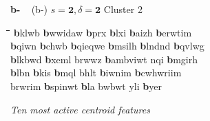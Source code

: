 \begin{figure}[ht]
\begin{mdframed}
{\LARGE \textbf{b-}}  {\large\,\,\, (b-)} \hfill {\large$s=\textbf{2}, \delta=\textbf{2}$} \hfill Cluster 2\\
\vspace{-10pt}
\begin{normalsize}
\begin{tabbing}
\hspace*{14ex}\= \hspace*{14ex}\=\hspace*{14ex}\=\hspace*{14ex}\=\hspace*{14ex}\=\hspace*{14ex} \kill
\textbf{b}klwb \> \textbf{b}wwidaw \> \textbf{b}prx \> \textbf{b}lxi \> \textbf{b}aizh \> \textbf{b}erwtim \\
\textbf{b}qiwn \> \textbf{b}chwb \> \textbf{b}qieqwe \> \textbf{b}msilh \> \textbf{b}lndnd \> \textbf{b}qvlwg \\
\textbf{b}lkbwd \> \textbf{b}xeml \> brwwz \> \textbf{b}ambviwt \> nqi \> \textbf{b}mgirh \\
\textbf{b}lbn \> \textbf{b}kis \>\textbf{b}mql \> bhlt \> \textbf{b}iwnim \>\textbf{b}cwhwriim \\
brwrim \> \textbf{b}spinwt \> \textbf{b}la \> bwbwt \> yli \> \textbf{b}yer
\end{tabbing}
\end{normalsize}
\vspace{-3pt}
\begin{mdframed}
\begin{small}
\textit{Ten most active centroid features}
\begin{tabbing}

\end{tabbing}
\end{small}
\end{mdframed}
\end{mdframed}
\end{figure}
